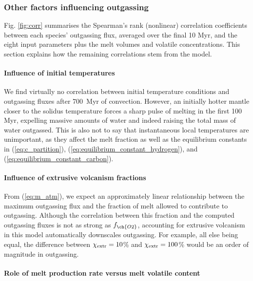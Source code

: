 \subsubsection{Other factors influencing outgassing}








Fig. \ref{fig:corr} summarises the Spearman's rank (nonlinear) correlation coefficients between each species' outgassing flux, averaged over the final 10 Myr, and the eight input parameters plus the melt volumes and volatile concentrations. This section explains how the remaining correlations stem from the model.

\paragraph{Influence of initial temperatures}

We find virtually no correlation between initial temperature conditions and outgassing fluxes after 700~Myr of convection. However, an initially hotter mantle closer to the solidus temperature forces a sharp pulse of melting in the first 100 Myr, expelling massive amounts of water and indeed raising the total mass of water outgassed. This is also not to say that instantaneous local temperatures are unimportant, as they affect the melt fraction as well as the equilibrium constants in (\ref{eq:c_partition}), (\ref{eq:equilibrium_constant_hydrogen}), and (\ref{eq:equilibrium_constant_carbon}).




\paragraph{Influence of extrusive volcanism fractions}

From (\ref{eq:m_atm}), we expect an approximately linear relationship between the maximum outgassing flux and the fraction of melt allowed to contribute to outgassing. Although the correlation between this fraction and the computed outgassing fluxes is not as strong as $f_{\ch{O2}}$, accounting for extrusive volcanism in this model automatically downscales outgassing. For example, all else being equal, the difference between $\chi_{\rm extr}=10$\% and $\chi_{\rm extr}=100$\% would be an order of magnitude in outgassing.


\paragraph{Role of melt production rate versus melt volatile content}

